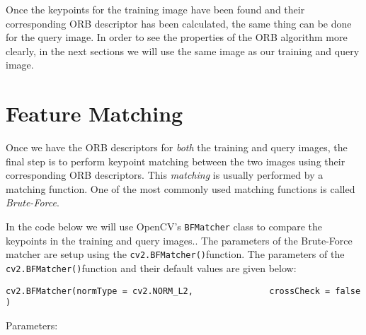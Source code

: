 \documentclass[11pt]{article}
\begin{document}
Once the keypoints for the training image have been found and their
corresponding ORB descriptor has been calculated, the same thing can be
done for the query image. In order to see the properties of the ORB
algorithm more clearly, in the next sections we will use the same image
as our training and query image.

    \hypertarget{feature-matching}{%
\section{Feature Matching}\label{feature-matching}}

Once we have the ORB descriptors for \emph{both} the training and query
images, the final step is to perform keypoint matching between the two
images using their corresponding ORB descriptors. This \emph{matching}
is usually performed by a matching function. One of the most commonly
used matching functions is called \emph{Brute-Force}.

In the code below we will use OpenCV's \texttt{BFMatcher} class to
compare the keypoints in the training and query images.. The parameters
of the Brute-Force matcher are setup using the
\texttt{cv2.BFMatcher()}function. The parameters of the
\texttt{cv2.BFMatcher()}function and their default values are given
below:

\texttt{cv2.BFMatcher(normType\ =\ cv2.NORM\_L2,\ \ \ \ \ \ \ \ \ \ \ \ \ \ \ crossCheck\ =\ false)}

Parameters:
\end{document}
